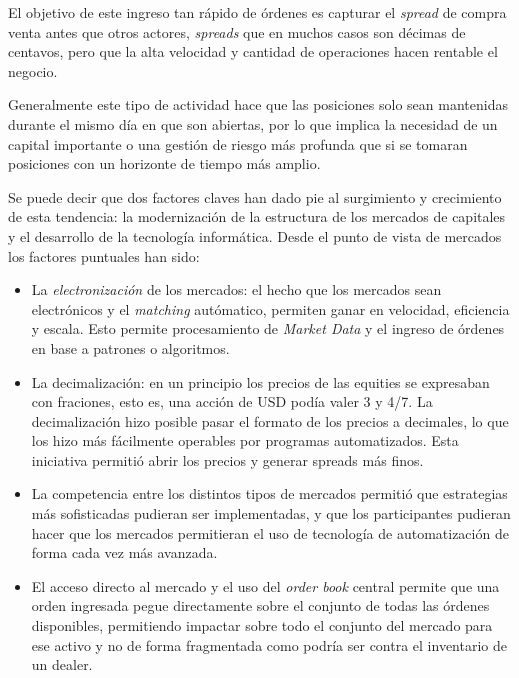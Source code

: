

El objetivo de este ingreso tan rápido de órdenes es capturar el \emph{spread}
de compra venta antes que otros actores, \emph{spreads} que en muchos casos son
décimas de centavos, pero que la alta velocidad y cantidad de operaciones hacen
rentable el negocio.

Generalmente este tipo de actividad hace que las posiciones solo sean
mantenidas durante el mismo día en que son abiertas, por lo que implica la
necesidad de un capital importante o una gestión de riesgo más profunda que si
se tomaran posiciones con un horizonte de tiempo más amplio.

Se puede decir que dos factores claves han dado pie al surgimiento y
crecimiento de esta tendencia: la modernización de la estructura de los
mercados de capitales y el desarrollo de la tecnología informática. Desde el
punto de vista de mercados los factores puntuales han sido:
\begin{itemize}
 \item La \emph{electronización} de los mercados: el hecho que los mercados
 sean electrónicos y el \emph{matching} autómatico, permiten ganar en
 velocidad, eficiencia y escala. Esto permite procesamiento de \emph{Market
 Data} y el ingreso de órdenes en base a patrones o algoritmos. 
 \item La decimalización: en un principio los precios de las equities se
 expresaban con fraciones, esto es, una acción de USD podía valer 3 y 4/7. La
 decimalización hizo posible pasar el formato de los precios a decimales, lo
 que los hizo más fácilmente operables por programas automatizados. Esta
 iniciativa permitió abrir los precios y generar spreads más finos.
 \item La competencia entre los distintos tipos de mercados permitió que
 estrategias más sofisticadas pudieran ser implementadas, y que los
 participantes pudieran hacer que los mercados permitieran el uso de tecnología
 de automatización de forma cada vez más avanzada.
 \item El acceso directo al mercado y el uso del \emph{order book} central
 permite que una orden ingresada pegue directamente sobre el conjunto de todas
 las órdenes disponibles, permitiendo impactar sobre todo el conjunto del
 mercado para ese activo y no de forma fragmentada como podría ser contra el
 inventario de un dealer.
\end{itemize}

